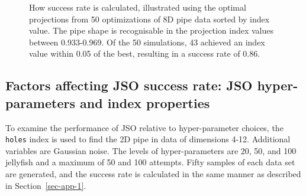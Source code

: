 \documentclass[
  12pt,
]{interact}
\theoremstyle{plain}
\begin{document}
\begin{figure}


\caption{\label{fig-success-rate}How success rate is calculated,
illustrated using the optimal projections from 50 optimizations of 8D
pipe data sorted by index value. The pipe shape is recognisable in the
projection index values between 0.933-0.969. Of the 50 simulations, 43
achieved an index value within 0.05 of the best, resulting in a success
rate of 0.86.}

\end{figure}%

\subsection{Factors affecting JSO success rate: JSO hyper-parameters and
index properties}\label{sec-app-2}

To examine the performance of JSO relative to hyper-parameter choices,
the \texttt{holes} index is used to find the 2D pipe in data of
dimensions 4-12. Additional variables are Gaussian noise. The levels of
hyper-parameters are 20, 50, and 100 jellyfish and a maximum of 50 and
100 attempts. Fifty samples of each data set are generated, and the
success rate is calculated in the same manner as described in
Section~\ref{sec-app-1}.
\end{document}

